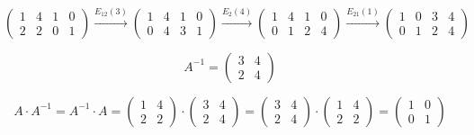 \[
	\begin{pmatrix}
		1 & 4 & 1 & 0 \\
		2 & 2 & 0 & 1
	\end{pmatrix}
	\xrightarrow{E_{12}(3)}
	\begin{pmatrix}
		1 & 4 & 1 & 0 \\
		0 & 4 & 3 & 1
	\end{pmatrix}
	\xrightarrow{E_{2}(4)}
	\begin{pmatrix}
		1 & 4 & 1 & 0 \\
		0 & 1 & 2 & 4
	\end{pmatrix}
	\xrightarrow{E_{21}(1)}
	\begin{pmatrix}
		1 & 0 & 3 & 4 \\
		0 & 1 & 2 & 4
	\end{pmatrix}
\]

\[
	A^{-1} =
	\begin{pmatrix}
	3 & 4 \\
	2 & 4
	\end{pmatrix}
\]

\[
	A \cdot A^{-1} = A^{-1} \cdot A =
	\begin{pmatrix}
		1 & 4 \\
		2 & 2
	\end{pmatrix}
	\cdot
	\begin{pmatrix}
	3 & 4 \\
	2 & 4
	\end{pmatrix}
	=
	\begin{pmatrix}
	3 & 4 \\
	2 & 4
	\end{pmatrix}
	\cdot
	\begin{pmatrix}
		1 & 4 \\
		2 & 2
	\end{pmatrix}
	=
	\begin{pmatrix}
		1 & 0 \\
		0 & 1
	\end{pmatrix}
\]
